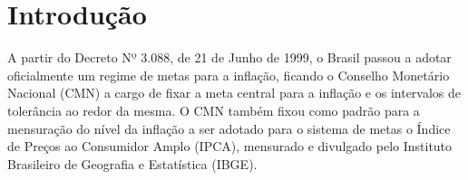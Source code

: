 \documentclass[
	article,			%
	11pt,				%
	oneside,			%
	a4paper,			%
	english,			%
	brazil,				%
	]{abntex2}
\begin{document}
\frenchspacing 


%
%
\maketitle
\thispagestyle{empty}
\pagebreak

\begin{KeepFromToc}
  \tableofcontents
\end{KeepFromToc}
\pagebreak

 
 


\textual

\section{Introdução}

	A partir do Decreto Nº 3.088, de 21 de Junho de 1999, o Brasil passou a adotar oficialmente um regime de metas para a inflação, ficando o Conselho Monetário Nacional (CMN) a cargo de fixar a meta central para a inflação e os intervalos de tolerância ao redor da mesma. O CMN também fixou como padrão para a mensuração do nível da inflação a ser adotado para o sistema de metas o Índice de Preços ao Consumidor Amplo (IPCA), mensurado e divulgado pelo Instituto Brasileiro de Geografia e Estatística (IBGE).
	
\end{document}

